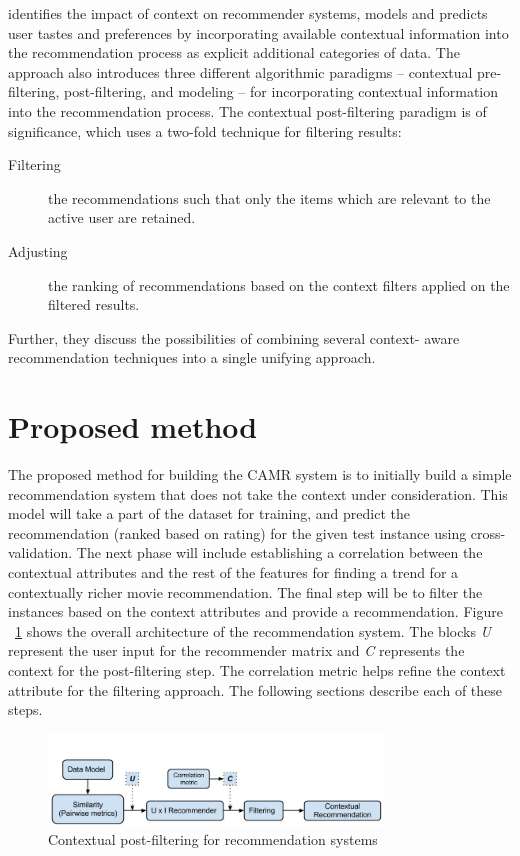 \documentclass{article}
\begin{document}
\cite{adomavicius2011context} identifies the impact of context on recommender systems, models and predicts user tastes and preferences by incorporating available contextual information into the recommendation process as explicit additional categories of data. The approach also introduces three different algorithmic paradigms – contextual pre-
filtering, post-filtering, and modeling – for incorporating contextual information into the recommendation process. The contextual post-filtering paradigm is of significance, which uses a two-fold technique for filtering results:
\begin{description}
\item[Filtering] the recommendations such that only the items which are relevant to the active user are retained.
\item[Adjusting] the ranking of recommendations based on the context filters applied on the filtered results.
\end{description}
Further, they discuss the possibilities of combining several context- aware recommendation techniques into a single unifying approach.

\section{Proposed method}
The proposed method for building the CAMR system is to initially build a simple recommendation system that does not take the context under consideration. This model will take a part of the dataset for training, and predict the recommendation (ranked based on rating) for the given test instance using cross-validation. The next phase will include establishing a correlation between the contextual attributes and the rest of the features for finding a trend for a contextually richer movie recommendation. The final step will be to filter the instances based on the context attributes and provide a recommendation. Figure ~\ref{archdiag} shows the overall architecture of the recommendation system. The blocks \textit{U} represent the user input for the recommender matrix and \textit{C} represents the context for the post-filtering step. The correlation metric helps refine the context attribute for the filtering approach.  The following sections describe each of these steps.

\begin{figure}[H]
\centering
\includegraphics[width=3.5in]{archdiagram.jpg}
\caption{Contextual post-filtering for recommendation systems}
\label{archdiag}
\end{figure}
\end{document}
